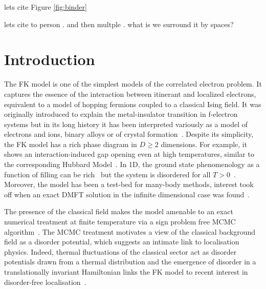 lets cite Figure \ref{fig:binder}

lets cite to person \textcite{trebstKitaevMaterials2022}. and then multple \autocite{banerjeeProximateKitaevQuantum2016,trebstKitaevMaterials2022}. what is we surround it by spaces? \textcite{trebstKitaevMaterials2022}

\hypertarget{introduction-1}{%
\section{Introduction}\label{introduction-1}}

The FK model is one of the simplest models of the correlated electron problem. It captures the essence of the interaction between itinerant and localized electrons, equivalent to a model of hopping fermions coupled to a classical Ising field. It was originally introduced to explain the metal-insulator transition in f-electron systems but in its long history it has been interpreted variously as a model of electrons and ions, binary alloys or of crystal formation~\autocite{hubbardj.ElectronCorrelationsNarrow1963,falicovSimpleModelSemiconductorMetal1969,gruberFalicovKimballModelReview1996,gruberFalicovKimballModel2006}. Despite its simplicity, the FK model has a rich phase diagram in \(D \geq 2\) dimensions. For example, it shows an interaction-induced gap opening even at high temperatures, similar to the corresponding Hubbard Model~\autocite{brandtThermodynamicsCorrelationFunctions1989}. In 1D, the ground state phenomenology as a function of filling can be rich~\autocite{gruberGroundStatesSpinless1990} but the system is disordered for all \(T > 0\)~\autocite{kennedyItinerantElectronModel1986}. Moreover, the model has been a test-bed for many-body methods, interest took off when an exact DMFT solution in the infinite dimensional case was found~\autocite{antipovCriticalExponentsStrongly2014,ribicNonlocalCorrelationsSpectral2016,freericksExactDynamicalMeanfield2003,herrmannNonequilibriumDynamicalCluster2016}.

The presence of the classical field makes the model amenable to an exact numerical treatment at finite temperature via a sign problem free MCMC algorithm~\autocite{devriesGapsDensitiesStates1993,devriesSimplifiedHubbardModel1993,antipovInteractionTunedAndersonMott2016,debskiPossibilityDetectionFinite2016,herrmannSpreadingCorrelationsFalicovKimball2018,maskaThermodynamicsTwodimensionalFalicovKimball2006}. The MCMC treatment motivates a view of the classical background field as a disorder potential, which suggests an intimate link to localisation physics. Indeed, thermal fluctuations of the classical sector act as disorder potentials drawn from a thermal distribution and the emergence of disorder in a translationally invariant Hamiltonian links the FK model to recent interest in disorder-free localisation~\autocite{smithDisorderFreeLocalization2017,smithDynamicalLocalizationMathbbZ2018,brenesManyBodyLocalizationDynamics2018}.


